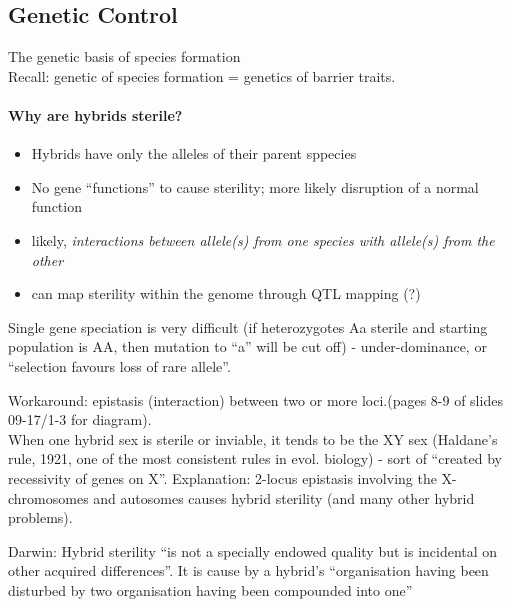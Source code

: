 \documentclass{scrartcl}
\begin{document}

\subsection{Genetic Control}
\label{sec:09-05}

The genetic basis of species formation\\
Recall: genetic of species formation = genetics of barrier traits.

\paragraph{Why are hybrids sterile?}

\begin{itemize}
\item Hybrids have only the alleles of their parent sppecies
\item No gene ``functions'' to cause sterility; more likely disruption of a normal function
\item likely, {\em interactions between allele(s) from one species with allele(s) from the other}
\item can map sterility within the genome through QTL mapping (?)
\end{itemize}

Single gene speciation is very difficult (if heterozygotes Aa sterile and starting population is AA, then mutation to ``a'' will be cut off) - under-dominance, or ``selection favours loss of rare allele''.

Workaround: epistasis (interaction) between two or more loci.(pages 8-9 of slides 09-17/1-3 for diagram).\\

When one hybrid sex is sterile or inviable, it tends to be the XY sex (Haldane's rule, 1921, one of the most consistent rules in evol. biology) - sort of ``created by recessivity of genes on X''.
Explanation: 2-locus epistasis involving the X-chromosomes and autosomes causes hybrid sterility (and many other hybrid problems).

Darwin: Hybrid sterility ``is not a specially endowed quality but is incidental on other acquired differences''.
It is cause by a hybrid's ``organisation having been disturbed by two organisation having been compounded into one''
\end{document}
